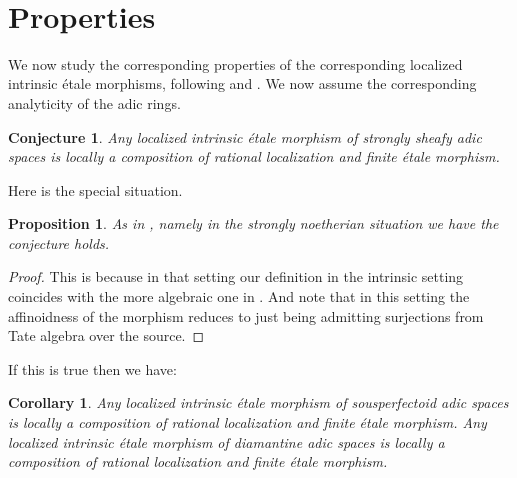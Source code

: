 \documentclass[12pt]{amsart}
\newtheorem{proposition}[theorem]{Proposition}
\newtheorem{corollary}[theorem]{Corollary}
\newtheorem{conjecture}[theorem]{Conjecture}
\theoremstyle{definition}
\newtheorem{remark}[theorem]{Remark}
\numberwithin{equation}{section}
\begin{document}
\

\section{Properties}

\indent We now study the corresponding properties of the corresponding localized intrinsic \'etale morphisms, following \cite{EGAIV4} and \cite{Hu1}. We now assume the corresponding analyticity of the adic rings. 



\begin{conjecture}
Any localized intrinsic \'etale morphism of strongly sheafy adic spaces is locally a composition of rational localization and finite \'etale morphism.	
\end{conjecture}

\indent Here is the special situation.

\begin{proposition}
As in \cite{Hu1}, namely in the strongly noetherian situation we have the conjecture holds.	
\end{proposition}

\begin{proof}
This is because in that setting our definition in the intrinsic setting coincides with the more algebraic one in \cite{Hu1}. And note that in this setting the affinoidness of the morphism reduces to just being admitting surjections from Tate algebra over the source.	
\end{proof}







\indent If this is true then we have:


\begin{corollary}
Any localized intrinsic \'etale morphism of sousperfectoid adic spaces is locally a composition of rational localization and finite \'etale morphism. Any localized intrinsic \'etale morphism of diamantine adic spaces is locally a composition of rational localization and finite \'etale morphism.	
\end{corollary}
\end{document}
